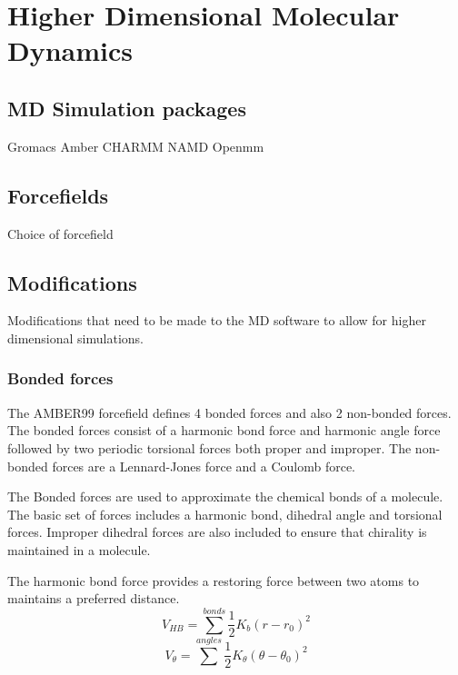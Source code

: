 \chapter{Higher Dimensional Molecular Dynamics}

\section{MD Simulation packages}

Gromacs
Amber
CHARMM
NAMD
Openmm

\section{Forcefields}
Choice of forcefield


\section{Modifications}

Modifications that need to be made to the MD software to allow for higher dimensional simulations.

\subsection{Bonded forces}
The AMBER99 forcefield defines 4 bonded forces and also 2 non-bonded forces. The bonded forces consist of a harmonic bond force and harmonic angle force followed by two periodic torsional forces both proper and improper. The non-bonded forces are a Lennard-Jones force and a Coulomb force. 

The Bonded forces are used to approximate the chemical bonds of a molecule. The basic set of forces includes a harmonic bond, dihedral angle and torsional forces. Improper dihedral forces are also included to ensure that chirality is maintained in a molecule. 

The harmonic bond force provides a restoring force between two atoms to maintains a preferred distance.
\begin{equation}\label{md:1:harmonic_bond}
V_{HB} = \sum^{bonds}\frac{1}{2} K_b (r - r_0)^2
\end{equation}
\begin{equation}\label{md:2:harmonic_angle}
V_{\theta} = \sum^{angles}\frac{1}{2} K_{\theta} (\theta - \theta_0)^2
\end{equation}


